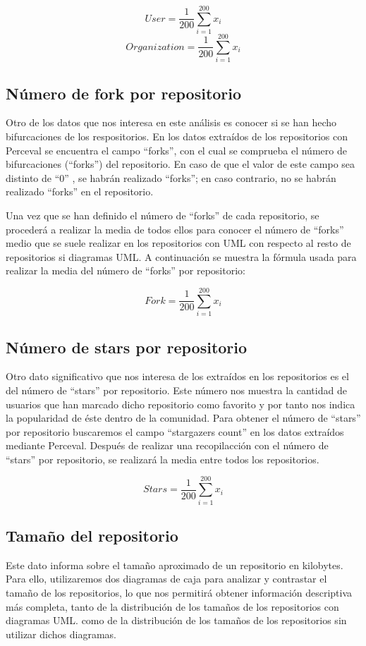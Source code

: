 \documentclass[a4paper, 12pt]{book}
\begin{document}
\[{User} = \frac{1}{200} \sum_{i=1}^{200} x_i\]
\[{Organization} = \frac{1}{200} \sum_{i=1}^{200} x_i\]


\subsection{Número de fork por repositorio} %
\label{sec:Número de fork por repositorio}

Otro de los datos que nos interesa en este análisis es conocer si se han hecho bifurcaciones de los respositorios.
En los datos extraídos de los repositorios con Perceval se encuentra el campo ``forks'', con el cual se comprueba el número de bifurcaciones (``forks'') del repositorio.
En caso de que el valor de este campo sea distinto de ``0'' , se habrán realizado ``forks''; en caso contrario, no se habrán realizado ``forks'' en el repositorio.


Una vez que se han definido el número de ``forks'' de cada repositorio, se procederá a realizar la media de todos ellos para conocer el número de ``forks'' medio que se suele realizar en los repositorios con UML con respecto al resto de repositorios si diagramas UML.
A continuación se muestra la fórmula usada para realizar la media del número de ``forks'' por repositorio:


\[{Fork} = \frac{1}{200} \sum_{i=1}^{200} x_i\]


\subsection{Número de stars por repositorio} %
\label{sec:número de stars por repositorio}

Otro dato significativo que nos interesa de los extraídos en los repositorios es el del número de ``stars'' por repositorio.
Este número nos muestra la cantidad de usuarios que han marcado dicho repositorio como favorito y por tanto nos indica la popularidad de éste dentro de la comunidad. 
Para obtener el número de ``stars'' por repositorio buscaremos el campo ``stargazers count'' en los datos extraídos mediante Perceval. 
Después de realizar una recopilacción con el número de ``stars'' por repositorio, se realizará la media entre todos los repositorios.

\[{Stars} = \frac{1}{200} \sum_{i=1}^{200} x_i\]


\subsection{Tamaño del repositorio} %
\label{sec:tamaño del repositorio}
Este dato informa sobre el tamaño aproximado de un repositorio en kilobytes. 
Para ello, utilizaremos dos diagramas de caja para analizar y contrastar el tamaño de los repositorios, lo que nos permitirá obtener información descriptiva más completa, tanto de la distribución de los tamaños de los repositorios con diagramas UML. como de la distribución de los tamaños de los repositorios sin utilizar dichos diagramas.
\end{document}
